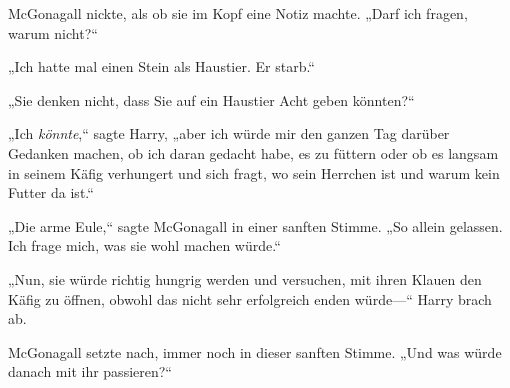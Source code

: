 McGonagall nickte, als ob sie im Kopf eine Notiz machte. „Darf ich fragen, warum nicht?“

„Ich hatte mal einen Stein als Haustier. Er starb.“

„Sie denken nicht, dass Sie auf ein Haustier Acht geben könnten?“

„Ich \emph{könnte},“ sagte Harry, „aber ich würde mir den ganzen Tag darüber Gedanken machen, ob ich daran gedacht habe, es zu füttern oder ob es langsam in seinem Käfig verhungert und sich fragt, wo sein Herrchen ist und warum kein Futter da ist.“

„Die arme Eule,“ sagte McGonagall in einer sanften Stimme. „So allein gelassen. Ich frage mich, was sie wohl machen würde.“

„Nun, sie würde richtig hungrig werden und versuchen, mit ihren Klauen den Käfig zu öffnen, obwohl das nicht sehr erfolgreich enden würde—“ Harry brach ab.

McGonagall setzte nach, immer noch in dieser sanften Stimme. „Und was würde danach mit ihr passieren?“

